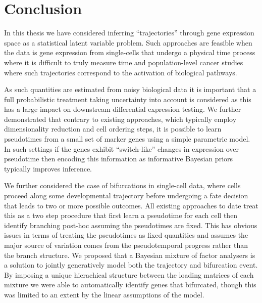 \chapter{Conclusion}\label{ch:conclusionchap} %

In this thesis we have considered inferring ``trajectories'' through gene expression space as a statistical latent variable problem. Such approaches are feasible when the data is gene expression from single-cells that undergo a physical time process where it is difficult to truly measure time and population-level cancer studies where such trajectories correspond to the activation of biological pathways. 

As such quantities are estimated from noisy biological data it is important that a full probabilistic treatment taking uncertainty into account is considered as this has a large impact on downstream differential expression testing. We further demonstrated that contrary to existing approaches, which typically employ dimensionality reduction and cell ordering steps, it is possible to learn pseudotimes from a small set of marker genes using a simple parametric model. In such settings if the genes exhibit ``switch-like'' changes in expression over pseudotime then encoding this information as informative Bayesian priors typically improves inference.

We further considered the case of bifurcations in single-cell data, where cells proceed along some developmental trajectory before undergoing a fate decision that leads to two or more possible outcomes. All existing approaches to date treat this as a two step procedure that first learn a pseudotime for each cell then identify branching post-hoc assuming the pseudotimes are fixed. This has obvious issues in terms of treating the pseudotimes as fixed quantities and assumes the major source of variation comes from the pseudotemporal progress rather than the branch structure. We proposed that a Bayesian mixture of factor analysers is a solution to jointly generatively model both the trajectory and bifurcation event. By imposing a unique hierachical structure between the loading matrices of each mixture we were able to automatically identify genes that bifurcated, though this was limited to an extent by the linear assumptions of the model.

